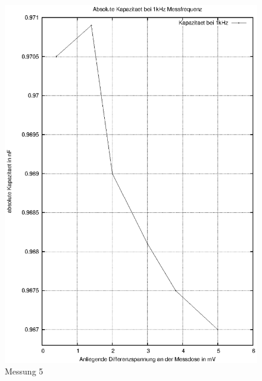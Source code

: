 \documentclass[12pt]{scrreprt} %
\begin{document}
\begin {figure}[htbp]
      \begin{center}
        \includegraphics{tabelle2_1_4}
      \end{center}
\caption{Messung 5}
\label{fig:2.4}
\end{figure}

\newpage
\end{document}
